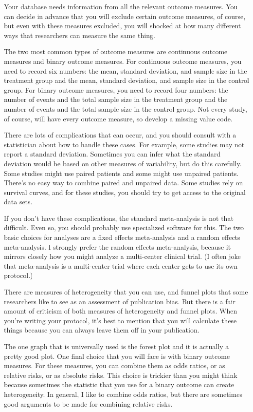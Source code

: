 \documentclass[
  letterpaper,
  DIV=11,
  numbers=noendperiod]{scrreprt}
\begin{document}
\begin{tcolorbox}
Your database needs information from all the relevant outcome measures.
You can decide in advance that you will exclude certain outcome
measures, of course, but even with these measures excluded, you will
shocked at how many different ways that researchers can measure the same
thing.

The two most common types of outcome measures are continuous outcome
measures and binary outcome measures. For continuous outcome measures,
you need to record six numbers: the mean, standard deviation, and sample
size in the treatment group and the mean, standard deviation, and sample
size in the control group. For binary outcome measures, you need to
record four numbers: the number of events and the total sample size in
the treatment group and the number of events and the total sample size
in the control group. Not every study, of course, will have every
outcome measure, so develop a missing value code.

There are lots of complications that can occur, and you should consult
with a statistician about how to handle these cases. For example, some
studies may not report a standard deviation. Sometimes you can infer
what the standard deviation would be based on other measures of
variability, but do this carefully. Some studies might use paired
patients and some might use unpaired patients. There's no easy way to
combine paired and unpaired data. Some studies rely on survival curves,
and for these studies, you should try to get access to the original data
sets.

If you don't have these complications, the standard meta-analysis is not
that difficult. Even so, you should probably use specialized software
for this. The two basic choices for analyses are a fixed effects
meta-analysis and a random effects meta-analysis. I strongly prefer the
random effects meta-analysis, because it mirrors closely how you might
analyze a multi-center clinical trial. (I often joke that meta-analysis
is a multi-center trial where each center gets to use its own protocol.)

There are measures of heterogeneity that you can use, and funnel plots
that some researchers like to see as an assessment of publication bias.
But there is a fair amount of criticism of both measures of
heterogeneity and funnel plots. When you're writing your protocol, it's
best to mention that you will calculate these things because you can
always leave them off in your publication.

The one graph that is universally used is the forest plot and it is
actually a pretty good plot. One final choice that you will face is with
binary outcome measures. For these measures, you can combine them as
odds ratios, or as relative risks, or as absolute risks. This choice is
trickier than you might think because sometimes the statistic that you
use for a binary outcome can create heterogeneity. In general, I like to
combine odds ratios, but there are sometimes good arguments to be made
for combining relative risks.


\end{tcolorbox}
\end{document}
